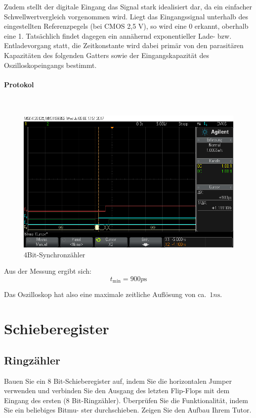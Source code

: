 \documentclass[10pt]{scrreprt}
\begin{document}
    \vspace{.5cm}

    Zudem stellt der digitale Eingang das Signal stark idealisiert dar, da ein einfacher
    Schwellwertvergleich vorgenommen wird. Liegt das Eingangssignal unterhalb des eingestellten
    Referenzpegels (bei CMOS 2,5 V), so wird eine 0 erkannt, oberhalb eine 1. Tatsächlich
    findet dagegen ein annähernd exponentieller Lade- bzw. Entladevorgang statt, die
    Zeitkonstante wird dabei primär von den parasitären Kapazitäten des folgenden Gatters sowie
    der Eingangskapazität des Oszilloskopeingangs bestimmt.

    \paragraph{Protokol}
    $ $
    \begin{figure}[H]
        \includegraphics[width=\textwidth]{scope_15.png}
        \caption{4Bit-Synchronzähler}
    \end{figure}
    Aus der Messung ergibt sich:
    \begin{equation*}
        t_{\min} = 900\si{p\second}
    \end{equation*}

    Das Oszilloskop hat also eine maximale zeitliche Auflösung von ca.~$1\si{n\second}$.

    \section{Schieberegister}
    \subsection{Ringzähler}
    Bauen Sie ein 8 Bit-Schieberegister auf, indem Sie die horizontalen Jumper verwenden
    und verbinden Sie den Ausgang des letzten Flip-Flops mit dem Eingang des ersten
    (8 Bit-Ringzähler). Überprüfen Sie die Funktionalität, indem Sie ein beliebiges Bitmu-
    ster \glqq{}durchschieben\grqq{}. Zeigen Sie den Aufbau Ihrem Tutor.
\end{document}
